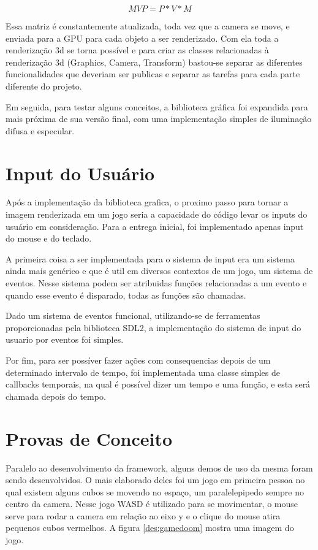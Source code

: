 \begin{equation}
  MVP = P * V * M
\end{equation}

Essa matriz é constantemente atualizada, toda vez que a camera se move, e enviada para a GPU para cada objeto a ser renderizado. Com ela toda a renderização 3d se torna possível e para criar as classes relacionadas à renderização 3d (Graphics, Camera, Transform) bastou-se separar as diferentes funcionalidades que deveriam ser publicas e separar as tarefas para cada parte diferente do projeto.

Em seguida, para testar alguns conceitos, a biblioteca gráfica foi expandida para mais próxima de sua versão final, com uma implementação simples de iluminação difusa e especular.

\section{Input do Usuário}

Após a implementação da biblioteca grafica, o proximo passo para tornar a imagem renderizada em um jogo seria a capacidade do código levar os inputs do usuário em consideração. Para a entrega inicial, foi implementado apenas input do mouse e do teclado.

A primeira coisa a ser implementada para o sistema de input era um sistema ainda mais genérico e que é util em diversos contextos de um jogo, um sistema de eventos. Nesse sistema podem ser atribuidas funções relacionadas a um evento e quando esse evento é disparado, todas as funções são chamadas.

Dado um sistema de eventos funcional, utilizando-se de ferramentas proporcionadas pela biblioteca SDL2, a implementação do sistema de input do usuario por eventos foi simples.

Por fim, para ser possíver fazer ações com consequencias depois de um determinado intervalo de tempo, foi implementada uma classe simples de callbacks temporais, na qual é possível dizer um tempo e uma função, e esta será chamada depois do tempo.

\section{Provas de Conceito}

Paralelo ao desenvolvimento da framework, alguns demos de uso da mesma foram sendo desenvolvidos. O mais elaborado deles foi um jogo em primeira pessoa no qual existem alguns cubos se movendo no espaço, um paralelepipedo sempre no centro da camera. Nesse jogo WASD é utilizado para se movimentar, o mouse serve para rodar a camera em relação ao eixo y e o clique do mouse atira pequenos cubos vermelhos. A figura \ref{des:gamedoom} mostra uma imagem do jogo.

